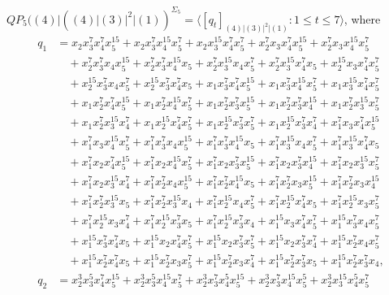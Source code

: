 \documentclass[reqno]{amsart}
\theoremstyle{plain}
\theoremstyle{definition}
\theoremstyle{plain}
\theoremstyle{definition}
\numberwithin{equation}{section}
\begin{document}
\medskip
$QP_5((4)|((4)|(3)|^2|(1))^{\Sigma_5} = \langle [q_t]_{(4)|(3)|^2|(1)} : 1 \leqslant t \leqslant 7 \rangle$, where
\begin{align*}
q_1 &= x_2x_3^{7}x_4^{7}x_5^{15} + x_2x_3^{7}x_4^{15}x_5^{7} + x_2x_3^{15}x_4^{7}x_5^{7} + x_2^{7}x_3x_4^{7}x_5^{15} + x_2^{7}x_3x_4^{15}x_5^{7}\\ 
&\quad + x_2^{7}x_3^{7}x_4x_5^{15} + x_2^{7}x_3^{7}x_4^{15}x_5 + x_2^{7}x_3^{15}x_4x_5^{7} + x_2^{7}x_3^{15}x_4^{7}x_5 + x_2^{15}x_3x_4^{7}x_5^{7}\\ 
&\quad + x_2^{15}x_3^{7}x_4x_5^{7} + x_2^{15}x_3^{7}x_4^{7}x_5 + x_1x_3^{7}x_4^{7}x_5^{15} + x_1x_3^{7}x_4^{15}x_5^{7} + x_1x_3^{15}x_4^{7}x_5^{7}\\ 
&\quad + x_1x_2^{7}x_4^{7}x_5^{15} + x_1x_2^{7}x_4^{15}x_5^{7} + x_1x_2^{7}x_3^{7}x_5^{15} + x_1x_2^{7}x_3^{7}x_4^{15} + x_1x_2^{7}x_3^{15}x_5^{7}\\ 
&\quad + x_1x_2^{7}x_3^{15}x_4^{7} + x_1x_2^{15}x_4^{7}x_5^{7} + x_1x_2^{15}x_3^{7}x_5^{7} + x_1x_2^{15}x_3^{7}x_4^{7} + x_1^{7}x_3x_4^{7}x_5^{15}\\ 
&\quad + x_1^{7}x_3x_4^{15}x_5^{7} + x_1^{7}x_3^{7}x_4x_5^{15} + x_1^{7}x_3^{7}x_4^{15}x_5 + x_1^{7}x_3^{15}x_4x_5^{7} + x_1^{7}x_3^{15}x_4^{7}x_5\\ 
&\quad + x_1^{7}x_2x_4^{7}x_5^{15} + x_1^{7}x_2x_4^{15}x_5^{7} + x_1^{7}x_2x_3^{7}x_5^{15} + x_1^{7}x_2x_3^{7}x_4^{15} + x_1^{7}x_2x_3^{15}x_5^{7}\\ 
&\quad + x_1^{7}x_2x_3^{15}x_4^{7} + x_1^{7}x_2^{7}x_4x_5^{15} + x_1^{7}x_2^{7}x_4^{15}x_5 + x_1^{7}x_2^{7}x_3x_5^{15} + x_1^{7}x_2^{7}x_3x_4^{15}\\ 
&\quad + x_1^{7}x_2^{7}x_3^{15}x_5 + x_1^{7}x_2^{7}x_3^{15}x_4 + x_1^{7}x_2^{15}x_4x_5^{7} + x_1^{7}x_2^{15}x_4^{7}x_5 + x_1^{7}x_2^{15}x_3x_5^{7}\\ 
&\quad + x_1^{7}x_2^{15}x_3x_4^{7} + x_1^{7}x_2^{15}x_3^{7}x_5 + x_1^{7}x_2^{15}x_3^{7}x_4 + x_1^{15}x_3x_4^{7}x_5^{7} + x_1^{15}x_3^{7}x_4x_5^{7}\\ 
&\quad + x_1^{15}x_3^{7}x_4^{7}x_5 + x_1^{15}x_2x_4^{7}x_5^{7} + x_1^{15}x_2x_3^{7}x_5^{7} + x_1^{15}x_2x_3^{7}x_4^{7} + x_1^{15}x_2^{7}x_4x_5^{7}\\ 
&\quad + x_1^{15}x_2^{7}x_4^{7}x_5 + x_1^{15}x_2^{7}x_3x_5^{7} + x_1^{15}x_2^{7}x_3x_4^{7} + x_1^{15}x_2^{7}x_3^{7}x_5 + x_1^{15}x_2^{7}x_3^{7}x_4,\\
q_2 &= x_2^{3}x_3^{5}x_4^{7}x_5^{15} + x_2^{3}x_3^{5}x_4^{15}x_5^{7} + x_2^{3}x_3^{7}x_4^{5}x_5^{15} + x_2^{3}x_3^{7}x_4^{15}x_5^{5} + x_2^{3}x_3^{15}x_4^{5}x_5^{7}\\ 

\end{align*}
\end{document}
